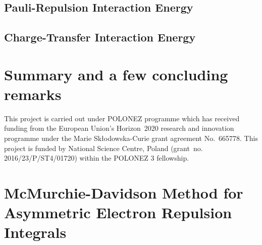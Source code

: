 \subsection{\label{ss.4.1}Pauli-Repulsion Interaction Energy}
\subsection{\label{ss.4.2}Charge-Transfer Interaction Energy}
\section{\label{s:5}Summary and a few concluding remarks}


\begin{acknowledgments}
This project is carried out under POLONEZ programme which has received funding from the European Union's
Horizon~2020 research and innovation programme under the Marie Skłodowska-Curie grant agreement 
No.~665778. This project is funded by National Science Centre, Poland 
(grant~no. 2016/23/P/ST4/01720) within the POLONEZ 3 fellowship.
\end{acknowledgments}

%
\appendix

\section{\label{a:mcmurchie-davidson} McMurchie-Davidson Method for Asymmetric Electron Repulsion Integrals}

